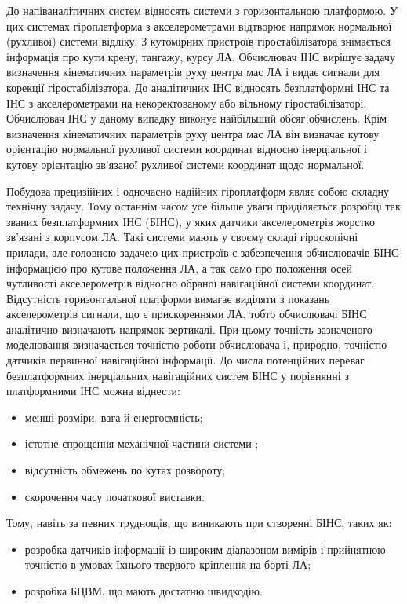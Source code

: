 До напіваналітичних систем відносять системи з горизонтальною платформою. У 
цих системах гіроплатформа з акселерометрами відтворює напрямок нормальної (рухливої) 
системи відліку. З кутомірних пристроїв гіростабілізатора знімається інформація про 
кути крену, тангажу, курсу ЛА. Обчислювач ІНС вирішує задачу визначення кінематичних 
параметрів руху центра мас ЛА і видає сигнали для корекції гіростабілізатора.
До аналітичних ІНС відносять безплатформні ІНС та ІНС з акселерометрами на некоректованому 
або вільному гіростабілізаторі. Обчислювач ІНС у даному випадку виконує найбільший обсяг 
обчислень. Крім визначення кінематичних параметрів руху центра мас ЛА він визначає кутову 
орієнтацію нормальної рухливої системи координат відносно інерціальної і кутову орієнтацію 
зв'язаної рухливої системи координат щодо нормальної. 

Побудова прецизійних і одночасно надійних гіроплатформ являє собою складну технічну задачу. 
Тому останнім часом усе більше уваги приділяється розробці так званих безплатформних ІНС (БІНС), 
у яких датчики акселерометрів жорстко зв’язані з корпусом ЛА. Такі системи мають у своєму складі 
гіроскопічні прилади, але головною задачею цих пристроїв є забезпечення обчислювачів БІНС 
інформацією про кутове положення ЛА, а так само про положення осей чутливості акселерометрів 
відносно обраної навігаційної системи координат. Відсутність горизонтальної платформи вимагає 
виділяти з показань акселерометрів сигнали, що є прискореннями ЛА, тобто обчислювачі БІНС 
аналітично визначають напрямок вертикалі. При цьому точність зазначеного моделювання 
визначається точністю роботи обчислювача і, природно, точністю датчиків первинної навігаційної інформації.
До числа потенційних переваг безплатформних інерціальних навігаційних систем БІНС у 
порівнянні з платформними ІНС можна віднести:

\begin{itemize}
 \item менші розміри, вага й енергоємність;
 \item істотне спрощення механічної частини системи ; 
 \item відсутність обмежень по кутах розвороту;
 \item скорочення часу початкової виставки.
\end{itemize}

Тому, навіть за певних труднощів, що виникають при створенні БІНС, таких як:
\begin{itemize}
 \item розробка датчиків інформації із широким діапазоном вимірів і прийнятною точністю в умовах їхнього твердого кріплення на борті ЛА;
 \item розробка БЦВМ, що мають достатню швидкодію.
\end{itemize}

